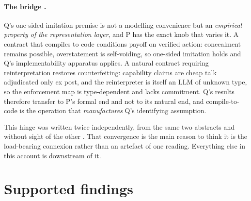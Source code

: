 \documentclass{article}
\begin{document}
\paragraph{The bridge .} Q's one-sided imitation premise is not a modelling convenience but an \emph{empirical property of the representation layer}, and P has the exact knob that varies it. A contract that compiles to code conditions payoff on verified action: concealment remains possible, overstatement is self-voiding, so one-sided imitation holds and Q's implementability apparatus applies. A natural contract requiring reinterpretation restores counterfeiting: capability claims are cheap talk adjudicated only ex post, and the reinterpreter is itself an LLM of unknown type, so the enforcement map is type-dependent and lacks commitment. Q's results therefore transfer to P's formal end and not to its natural end, and compile-to-code is the operation that \emph{manufactures} Q's identifying assumption.

This hinge was written twice independently, from the same two abstracts and without sight of the other . That convergence is the main reason to think it is the load-bearing connexion rather than an artefact of one reading. Everything else in this account is downstream of it.

\section{Supported findings}
\end{document}
